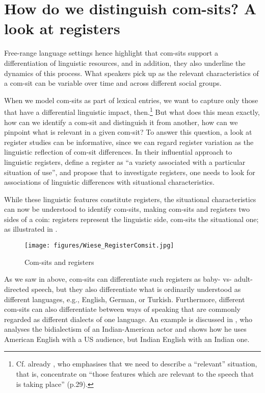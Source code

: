 \section{How do we distinguish com-sits? A look at registers}
\label{bkm:Ref114129291}\hypertarget{Toc125444659}{}
Free-range language settings hence highlight that com-sits support a differentiation of linguistic resources, and in addition, they also underline the dynamics of this process. What speakers pick up as the relevant characteristics of a com-sit can be variable over time and across different social groups.

When we model com-sits as part of lexical entries, we want to capture only those that have a differential linguistic impact, then.\footnote{Cf. already \citet[Ch. 1.5]{Halliday1978}, who emphasises that we need to describe a “relevant” situation, that is, concentrate on “those features which are relevant to the speech that is taking place” (p.29).} But what does this mean exactly, how can we identify a com-sit and distinguish it from another, how can we pinpoint what is relevant in a given com-sit? To answer this question, a look at register studies can be informative, since we can regard register variation as the linguistic reflection of com-sit differences. In their influential approach to linguistic registers, \citet[6]{BiberConrad2009} define a register as “a variety associated with a particular situation of use”, and propose that to investigate registers, one needs to look for associations of linguistic differences with situational characteristics.

While these linguistic features constitute registers, the situational characteristics can now be understood to identify com-sits, making com-sits and registers two sides of a coin: registers represent the linguistic side, com-sits the situational one; as illustrated in .

\begin{figure}
\texttt{[image: figures/Wiese\_RegisterComsit.jpg]}
\caption{Com-sits and registers}
\label{fig:12}
\end{figure}

As we saw in  above, com-sits can differentiate such registers as baby- vs- adult-directed speech, but they also differentiate what is ordinarily understood as different languages, e.g., English, German, or Turkish. Furthermore, different com-sits can also differentiate between ways of speaking that are commonly regarded as different dialects of one language. An example is discussed in \citet{Sharma2018}, who analyses the bidialectism of an Indian-American actor and shows how he uses American English with a US audience, but Indian English with an Indian one.

